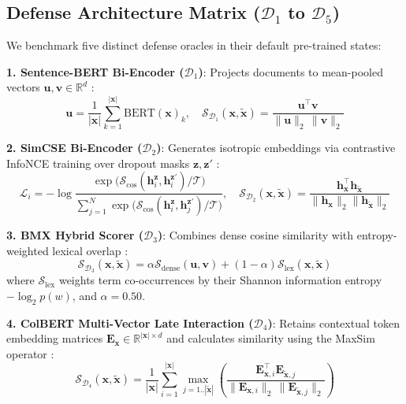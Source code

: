 \documentclass[conference,onecolumn,11pt]{IEEEtran}
\begin{document}
\subsection{Defense Architecture Matrix ($\mathcal{D}_1$ to $\mathcal{D}_5$)}
We benchmark five distinct defense oracles in their default pre-trained states:

\textbf{1. Sentence-BERT Bi-Encoder ($\mathcal{D}_1$)}: Projects documents to mean-pooled vectors $\mathbf{u}, \mathbf{v} \in \mathbb{R}^d$ \cite{reimers2019sbert}:
\begin{equation}
    \mathbf{u} = \frac{1}{|\mathbf{x}|} \sum_{k=1}^{|\mathbf{x}|} \text{BERT}(\mathbf{x})_k, \quad \mathcal{S}_{\mathcal{D}_1}(\mathbf{x}, \mathbf{\tilde{x}}) = \frac{\mathbf{u}^\top \mathbf{v}}{\|\mathbf{u}\|_2 \, \|\mathbf{v}\|_2}
    \label{eq:sbert}
\end{equation}

\textbf{2. SimCSE Bi-Encoder ($\mathcal{D}_2$)}: Generates isotropic embeddings via contrastive InfoNCE training over dropout masks $\mathbf{z}, \mathbf{z}'$ \cite{gao2021simcse}:
\begin{equation}
    \mathcal{L}_i = -\log \frac{\exp\big(\mathcal{S}_{\text{cos}}(\mathbf{h}_i^\mathbf{z}, \mathbf{h}_i^{\mathbf{z}'}) / \mathcal{T}\big)}{\sum_{j=1}^N \exp\big(\mathcal{S}_{\text{cos}}(\mathbf{h}_i^\mathbf{z}, \mathbf{h}_j^{\mathbf{z}'}) / \mathcal{T}\big)}, \quad \mathcal{S}_{\mathcal{D}_2}(\mathbf{x}, \mathbf{\tilde{x}}) = \frac{\mathbf{h}_{\mathbf{x}}^\top \mathbf{h}_{\mathbf{\tilde{x}}}}{\|\mathbf{h}_{\mathbf{x}}\|_2 \|\mathbf{h}_{\mathbf{\tilde{x}}}\|_2}
    \label{eq:simcse}
\end{equation}

\textbf{3. BMX Hybrid Scorer ($\mathcal{D}_3$)}: Combines dense cosine similarity with entropy-weighted lexical overlap \cite{li2024bmx, robertson2009bm25}:
\begin{equation}
    \mathcal{S}_{\mathcal{D}_3}(\mathbf{x}, \mathbf{\tilde{x}}) = \alpha \mathcal{S}_{\text{dense}}(\mathbf{u}, \mathbf{v}) + (1 - \alpha) \mathcal{S}_{\text{lex}}(\mathbf{x}, \mathbf{\tilde{x}})
    \label{eq:bmx}
\end{equation}
where $\mathcal{S}_{\text{lex}}$ weights term co-occurrences by their Shannon information entropy $-\log_2 p(w)$, and $\alpha = 0.50$.

\textbf{4. ColBERT Multi-Vector Late Interaction ($\mathcal{D}_4$)}: Retains contextual token embedding matrices $\mathbf{E}_{\mathbf{x}} \in \mathbb{R}^{|\mathbf{x}| \times d}$ and calculates similarity using the MaxSim operator \cite{khattab2020colbert, mysore2022scientific}:
\begin{equation}
    \mathcal{S}_{\mathcal{D}_4}(\mathbf{x}, \mathbf{\tilde{x}}) = \frac{1}{|\mathbf{x}|} \sum_{i=1}^{|\mathbf{x}|} \max_{j=1..|\mathbf{\tilde{x}}|} \left( \frac{\mathbf{E}_{\mathbf{x}, i}^\top \mathbf{E}_{\mathbf{\tilde{x}}, j}}{\|\mathbf{E}_{\mathbf{x}, i}\|_2 \, \|\mathbf{E}_{\mathbf{\tilde{x}}, j}\|_2} \right)
    \label{eq:colbert}
\end{equation}
\end{document}
